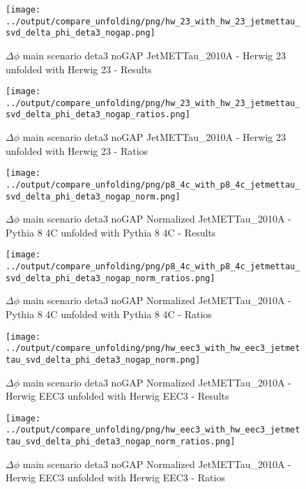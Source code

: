 \documentclass[11pt]{book}
\begin{document}
\begin{figure}[ht]
\centering
\texttt{[image: ../output/compare\_unfolding/png/hw\_23\_with\_hw\_23\_jetmettau\_svd\_delta\_phi\_deta3\_nogap.png]}
\caption{$\Delta\phi$ main scenario deta3 noGAP JetMETTau\_2010A - Herwig 23 unfolded with Herwig 23 - Results}
\label{hw_23_hw_23_jetmettau_svd_delta_phi_deta3_nogap_a}
\end{figure}

\begin{figure}[ht]
\centering
\texttt{[image: ../output/compare\_unfolding/png/hw\_23\_with\_hw\_23\_jetmettau\_svd\_delta\_phi\_deta3\_nogap\_ratios.png]}
\caption{$\Delta\phi$ main scenario deta3 noGAP JetMETTau\_2010A - Herwig 23 unfolded with Herwig 23 - Ratios}
\label{hw_23_hw_23_jetmettau_svd_delta_phi_deta3_nogap_b}
\end{figure}


\begin{figure}[ht]
\centering
\texttt{[image: ../output/compare\_unfolding/png/p8\_4c\_with\_p8\_4c\_jetmettau\_svd\_delta\_phi\_deta3\_nogap\_norm.png]}
\caption{$\Delta\phi$ main scenario deta3 noGAP Normalized JetMETTau\_2010A - Pythia 8 4C unfolded with Pythia 8 4C - Results}
\label{p8_p8_jetmettau_svd_delta_phi_deta3_nogap_norm_a}
\end{figure}

\begin{figure}[ht]
\centering
\texttt{[image: ../output/compare\_unfolding/png/p8\_4c\_with\_p8\_4c\_jetmettau\_svd\_delta\_phi\_deta3\_nogap\_norm\_ratios.png]}
\caption{$\Delta\phi$ main scenario deta3 noGAP Normalized JetMETTau\_2010A - Pythia 8 4C unfolded with Pythia 8 4C - Ratios}
\label{p8_p8_jetmettau_svd_delta_phi_deta3_nogap_norm_b}
\end{figure}

\begin{figure}[ht]
\centering
\texttt{[image: ../output/compare\_unfolding/png/hw\_eec3\_with\_hw\_eec3\_jetmettau\_svd\_delta\_phi\_deta3\_nogap\_norm.png]}
\caption{$\Delta\phi$ main scenario deta3 noGAP Normalized JetMETTau\_2010A - Herwig EEC3 unfolded with Herwig EEC3 - Results}
\label{hw_eec3_hw_eec3_jetmettau_svd_delta_phi_deta3_nogap_norm_a}
\end{figure}

\begin{figure}[ht]
\centering
\texttt{[image: ../output/compare\_unfolding/png/hw\_eec3\_with\_hw\_eec3\_jetmettau\_svd\_delta\_phi\_deta3\_nogap\_norm\_ratios.png]}
\caption{$\Delta\phi$ main scenario deta3 noGAP Normalized JetMETTau\_2010A - Herwig EEC3 unfolded with Herwig EEC3 - Ratios}
\label{hw_eec3_hw_eec3_jetmettau_svd_delta_phi_deta3_nogap_norm_b}
\end{figure}
\end{document}
